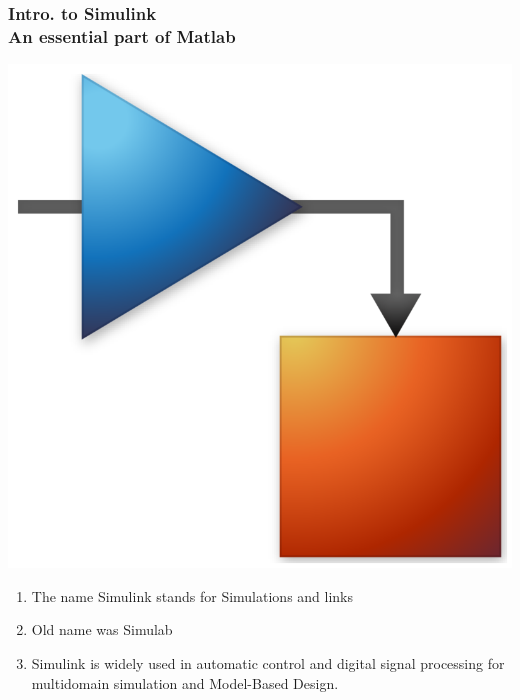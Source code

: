 \documentclass[hyperref={pdfpagelabels=true}]{beamer}
\begin{document}
\begin{frame}
\frametitle{Intro. to Simulink \\ {\large An essential part of Matlab}}
\begin{flushright}
\includegraphics[scale = 0.05]{figs/Selection_036.png}
\end{flushright}
\begin{enumerate}
\item The name Simulink stands for Simulations and links
\item Old name was Simulab 
\item Simulink is widely used in automatic control and digital signal processing for multidomain simulation and Model-Based Design.
\end{enumerate}
\end{frame}
\end{document}
